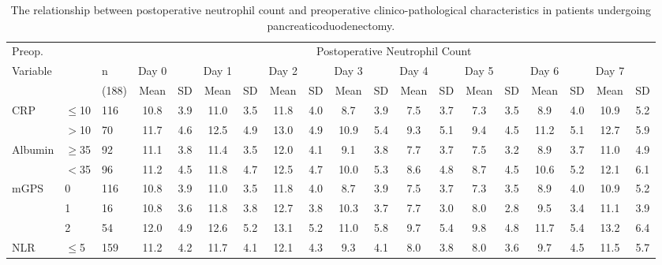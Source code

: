 \begin{sidewaystable}[p]
	\caption{The relationship  between postoperative neutrophil count and preoperative clinico-pathological characteristics in patients undergoing pancreaticoduodenectomy. }
	\label{table:sirs_neut}
	\footnotesize
	\centering
	\renewcommand{\arraystretch}{1.2} %
	
	\begin{tabular}{|l ll | cc cc cc cc cc cc cc cc|}
		\hline
		Preop.              &           &       &                             \multicolumn{16}{c|}{Postoperative Neutrophil Count}                              \\
		Variable            &           & n     & Day 0 &     & Day 1 &     & Day 2 &     & Day 3 &     & Day 4 &     & Day 5 &     & Day 6 &     & Day 7 &  \\
		                    &           & (188) & Mean  & SD  & Mean  & SD  & Mean  & SD  & Mean  & SD  & Mean  & SD  & Mean  & SD  & Mean  & SD  & Mean  & SD  \\ \hline
		CRP                 & $\leq$10  & 116   & 10.8  & 3.9 & 11.0  & 3.5 & 11.8  & 4.0 & 8.7   & 3.9 & 7.5   & 3.7 & 7.3   & 3.5 & 8.9   & 4.0 & 10.9  & 5.2 \\
		                    & $>$10     & 70    & 11.7  & 4.6 & 12.5  & 4.9 & 13.0  & 4.9 & 10.9  & 5.4 & 9.3   & 5.1 & 9.4   & 4.5 & 11.2  & 5.1 & 12.7  & 5.9 \\
		Albumin             & $\geq$35  & 92    & 11.1  & 3.8 & 11.4  & 3.5 & 12.0  & 4.1 & 9.1   & 3.8 & 7.7   & 3.7 & 7.5   & 3.2 & 8.9   & 3.7 & 11.0  & 4.9 \\
		                    & $<$35     & 96    & 11.2  & 4.5 & 11.8  & 4.7 & 12.5  & 4.7 & 10.0  & 5.3 & 8.6   & 4.8 & 8.7   & 4.5 & 10.6  & 5.2 & 12.1  & 6.1 \\
		mGPS                & 0         & 116   & 10.8  & 3.9 & 11.0  & 3.5 & 11.8  & 4.0 & 8.7   & 3.9 & 7.5   & 3.7 & 7.3   & 3.5 & 8.9   & 4.0 & 10.9  & 5.2 \\
		                    & 1         & 16    & 10.8  & 3.6 & 11.8  & 3.8 & 12.7  & 3.8 & 10.3  & 3.7 & 7.7   & 3.0 & 8.0   & 2.8 & 9.5   & 3.4 & 11.1  & 3.9 \\
		                    & 2         & 54    & 12.0  & 4.9 & 12.6  & 5.2 & 13.1  & 5.2 & 11.0  & 5.8 & 9.7   & 5.4 & 9.8   & 4.8 & 11.7  & 5.4 & 13.2  & 6.4 \\
		NLR                 & $\leq$5   & 159   & 11.2  & 4.2 & 11.7  & 4.1 & 12.1  & 4.3 & 9.3   & 4.1 & 8.0   & 3.8 & 8.0   & 3.6 & 9.7   & 4.5 & 11.5  & 5.7 \\

\end{tabular}
\end{sidewaystable}
